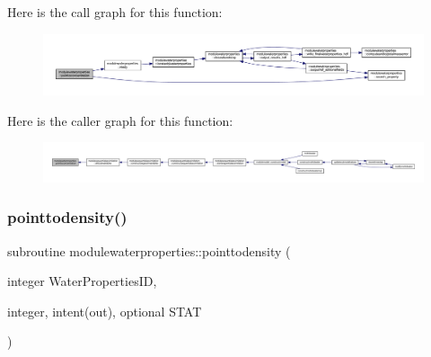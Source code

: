 Here is the call graph for this function\+:\nopagebreak
\begin{figure}[H]
\begin{center}
\leavevmode
\includegraphics[width=350pt]{namespacemodulewaterproperties_a4a3c2baf1d479b6f25201db3550c7a46_cgraph}
\end{center}
\end{figure}
Here is the caller graph for this function\+:\nopagebreak
\begin{figure}[H]
\begin{center}
\leavevmode
\includegraphics[width=350pt]{namespacemodulewaterproperties_a4a3c2baf1d479b6f25201db3550c7a46_icgraph}
\end{center}
\end{figure}
\mbox{\label{namespacemodulewaterproperties_a4585c55e4791aa9e486553e2e0ad3c5c}} 
\subsubsection{\texorpdfstring{pointtodensity()}{pointtodensity()}}
{\footnotesize\ttfamily subroutine modulewaterproperties\+::pointtodensity (\begin{DoxyParamCaption}\item[{integer}]{Water\+Properties\+ID,  }\item[{integer, intent(out), optional}]{S\+T\+AT }\end{DoxyParamCaption})\hspace{0.3cm}{\ttfamily [private]}}


